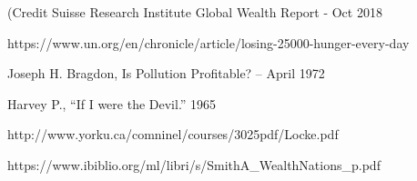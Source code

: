 \documentclass[11pt]{article}
\begin{document}
\begin{multicols}{2}
\begin{thebibliography}{9}
	{\footnotesize
	 (Credit Suisse Research Institute Global Wealth Report - Oct 2018
		
	 https://www.un.org/en/chronicle/article/losing-25000-hunger-every-day
	
	 Joseph H. Bragdon, Is Pollution Profitable? – April 1972
	
	 Harvey P., ``If I were the Devil.'' 1965
	
	 http://www.yorku.ca/comninel/courses/3025pdf/Locke.pdf
	
	 https://www.ibiblio.org/ml/libri/s/SmithA\_WealthNations\_p.pdf
	}
\end{thebibliography}
\end{multicols}


\end{document}
